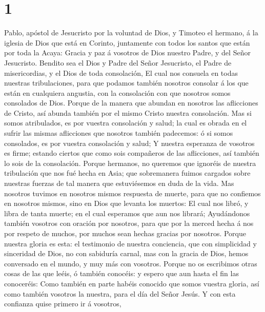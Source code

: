 \hypertarget{section}{%
\section{1}\label{section}}

 Pablo, apóstol de Jesucristo por la voluntad de Dios, y
Timoteo el hermano, á la iglesia de Dios que está en Corinto, juntamente
con todos los santos que están por toda la Acaya:  Gracia
y paz á vosotros de Dios nuestro Padre, y del Señor Jesucristo.
 Bendito sea el Dios y Padre del Señor Jesucristo, el
Padre de misericordias, y el Dios de toda consolación,  El
cual nos consuela en todas nuestras tribulaciones, para que podamos
también nosotros consolar á los que están en cualquiera angustia, con la
consolación con que nosotros somos consolados de Dios. 
Porque de la manera que abundan en nosotros las aflicciones de Cristo,
así abunda también por el mismo Cristo nuestra consolación.
 Mas si somos atribulados, es por vuestra consolación y
salud; la cual es obrada en el sufrir las mismas aflicciones que
nosotros también padecemos: ó si somos consolados, es por vuestra
consolación y salud;  Y nuestra esperanza de vosotros es
firme; estando ciertos que como sois compañeros de las aflicciones, así
también lo sois de la consolación.  Porque hermanos, no
queremos que ignoréis de nuestra tribulación que nos fué hecha en Asia;
que sobremanera fuimos cargados sobre nuestras fuerzas de tal manera que
estuviésemos en duda de la vida.  Mas nosotros tuvimos en
nosotros mismos respuesta de muerte, para que no confiemos en nosotros
mismos, sino en Dios que levanta los muertos:  El cual
nos libró, y libra de tanta muerte; en el cual esperamos que aun nos
librará;  Ayudándonos también vosotros con oración por
nosotros, para que por la merced hecha á nos por respeto de muchos, por
muchos sean hechas gracias por nosotros.  Porque nuestra
gloria es esta: el testimonio de nuestra conciencia, que con simplicidad
y sinceridad de Dios, no con sabiduría carnal, mas con la gracia de
Dios, hemos conversado en el mundo, y muy más con vosotros.
 Porque no os escribimos otras cosas de las que leéis, ó
también conocéis: y espero que aun hasta el fin las conoceréis:
 Como también en parte habéis conocido que somos vuestra
gloria, así como también vosotros la nuestra, para el día del Señor
Jesús.  Y con esta confianza quise primero ir á vosotros,
